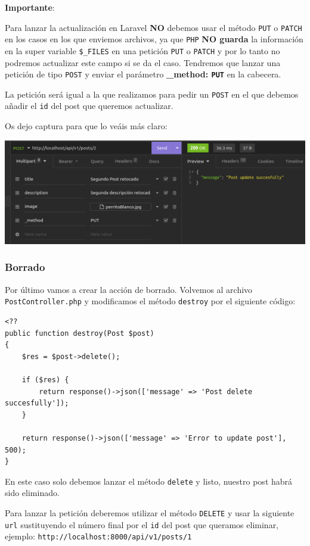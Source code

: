 \documentclass[11pt]{article}
\begin{document}
\textbf{Importante}:
\begin{mdframed}
Para lanzar la actualización en Laravel \textbf{NO} debemos usar el
método \texttt{PUT} o \texttt{PATCH} en los casos en los que enviemos archivos, ya
que \texttt{PHP} \textbf{NO guarda} la información en la super variable \texttt{\$\_FILES} en una
petición \texttt{PUT} o \texttt{PATCH} y por lo tanto no podremos actualizar este campo
si se da el caso. Tendremos que lanzar una petición de tipo \texttt{POST} y
enviar el parámetro \textbf{\_method: \texttt{PUT}} en la cabecera.
\end{mdframed}

La petición será igual a la que realizamos para pedir un \texttt{POST} en el
que debemos añadir el \texttt{id} del post que queremos actualizar.

Os dejo captura para que lo veáis más claro:
\begin{center}
\includegraphics[width=.9\linewidth]{UpdatePost.png}
\end{center}

\subsubsection{Borrado}
\label{sec:orgacd4180}
Por último vamos a crear la acción de borrado. Volvemos al archivo
\texttt{PostController.php} y modificamos el método \texttt{destroy} por el siguiente
código:
\begin{verbatim}
<??
public function destroy(Post $post)
{
    $res = $post->delete();

    if ($res) {
        return response()->json(['message' => 'Post delete succesfully']);
    }

    return response()->json(['message' => 'Error to update post'], 500);
}
\end{verbatim}

En este caso solo debemos lanzar el método \texttt{delete} y listo, nuestro
post habrá sido eliminado.

Para lanzar la petición deberemos utilizar el método \texttt{DELETE} y usar la
siguiente \texttt{url} sustituyendo el número final por el \texttt{id} del post que
queramos eliminar, ejemplo: \texttt{http://localhost:8000/api/v1/posts/1}
\end{document}
